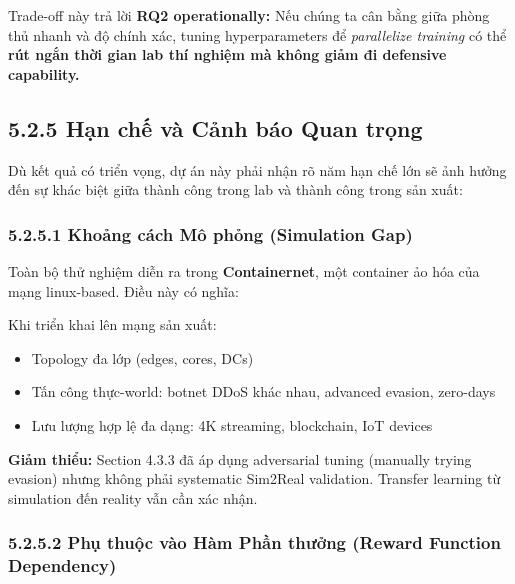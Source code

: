 \documentclass[12pt,a4paper,twoside]{report}
\begin{document}
{{{{{{{{{{{Trade-off này trả lời \textbf{RQ2 operationally:} Nếu chúng ta cân bằng giữa phòng thủ nhanh và độ chính xác, tuning hyperparameters để \textit{parallelize training} có thể \textbf{rút ngắn thời gian lab thí nghiệm mà không giảm đi defensive capability.}


\subsection{5.2.5 Hạn chế và Cảnh báo Quan trọng}

Dù kết quả có triển vọng, dự án này phải nhận rõ năm hạn chế lớn sẽ ảnh hưởng đến sự khác biệt giữa thành công trong lab và thành công trong sản xuất:

\subsubsection{5.2.5.1 Khoảng cách Mô phỏng (Simulation Gap)}

Toàn bộ thử nghiệm diễn ra trong \textbf{Containernet}, một container ảo hóa của mạng linux-based. Điều này có nghĩa:

Khi triển khai lên mạng sản xuất:
\begin{itemize}
\item Topology đa lớp (edges, cores, DCs)
\item Tấn công thực-world: botnet DDoS khác nhau, advanced evasion, zero-days
\item Lưu lượng hợp lệ đa dạng: 4K streaming, blockchain, IoT devices
\end{itemize}

\textbf{Giảm thiểu:} Section 4.3.3 đã áp dụng adversarial tuning (manually trying evasion) nhưng không phải systematic Sim2Real validation. Transfer learning từ simulation đến reality vẫn cần xác nhận.

\subsubsection{5.2.5.2 Phụ thuộc vào Hàm Phần thưởng (Reward Function Dependency)}

}}}}}}}}}}}
\end{document}
